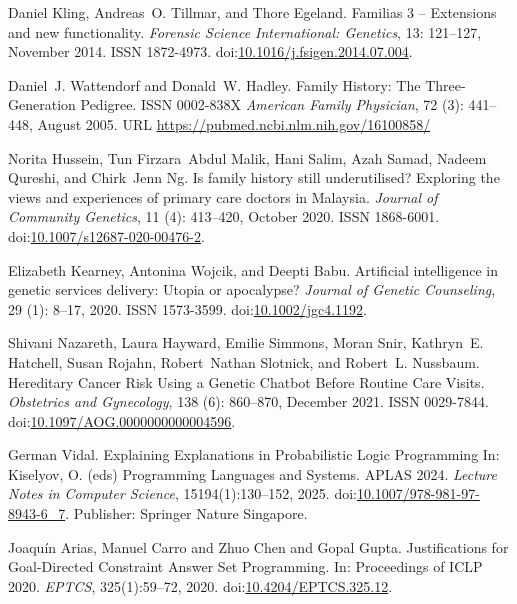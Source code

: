 \documentclass{eptcs}
\providecommand{\urlalt}[2]{\href{#1}{#2}}
\providecommand{\doi}[1]{doi:\urlalt{http://dx.doi.org/#1}{#1}}
\begin{document}
\begin{thebibliography}{}
Daniel Kling, Andreas~O. Tillmar, and Thore Egeland.
\newblock Familias 3 – {Extensions} and new functionality.
\newblock \emph{Forensic Science International: Genetics}, 13: 121--127, November 2014.
\newblock ISSN 1872-4973.
\newblock \doi{10.1016/j.fsigen.2014.07.004}.

Daniel~J. Wattendorf and Donald~W. Hadley.
\newblock Family {History}: {The} {Three}-{Generation} {Pedigree}.
\newblock ISSN 0002-838X
\newblock \emph{American Family Physician}, 72 (3): 441--448, August 2005.
\newblock URL \url{https://pubmed.ncbi.nlm.nih.gov/16100858/}

Norita Hussein, Tun Firzara~Abdul Malik, Hani Salim, Azah Samad, Nadeem Qureshi, and Chirk~Jenn Ng.
\newblock Is family history still underutilised? {Exploring} the views and experiences of primary care doctors in {Malaysia}.
\newblock \emph{Journal of Community Genetics}, 11 (4): 413--420, October 2020.
\newblock ISSN 1868-6001.
\newblock \doi{10.1007/s12687-020-00476-2}.


Elizabeth Kearney, Antonina Wojcik, and Deepti Babu.
\newblock Artificial intelligence in genetic services delivery: {Utopia} or apocalypse?
\newblock \emph{Journal of Genetic Counseling}, 29 (1): 8--17, 2020.
\newblock ISSN 1573-3599.
\newblock \doi{10.1002/jgc4.1192}.

Shivani Nazareth, Laura Hayward, Emilie Simmons, Moran Snir, Kathryn~E. Hatchell, Susan Rojahn, Robert~Nathan Slotnick, and Robert~L. Nussbaum.
\newblock Hereditary {Cancer} {Risk} {Using} a {Genetic} {Chatbot} {Before} {Routine} {Care} {Visits}.
\newblock \emph{Obstetrics and Gynecology}, 138 (6): 860--870, December 2021.
\newblock ISSN 0029-7844.
\newblock \doi{10.1097/AOG.0000000000004596}.

    German Vidal.
    \newblock Explaining {Explanations} in {Probabilistic} {Logic} {Programming}
    \newblock In: Kiselyov, O. (eds) Programming Languages and Systems. APLAS 2024. \emph{Lecture Notes in Computer Science}, 15194(1):130--152, 2025.
    \newblock \doi{10.1007/978-981-97-8943-6\_7}.
    \newblock Publisher: Springer Nature Singapore.

    {J}oaquín Arias, Manuel Carro and Zhuo Chen and Gopal Gupta.
    \newblock Justifications for {Goal}-{Directed} {Constraint} {Answer} {Set} {Programming}.
    \newblock In: Proceedings of ICLP 2020.
    \newblock \textit{EPTCS}, 325(1):59--72, 2020.
	\newblock \doi{10.4204/EPTCS.325.12}.
  
\end{thebibliography}
\end{document}
